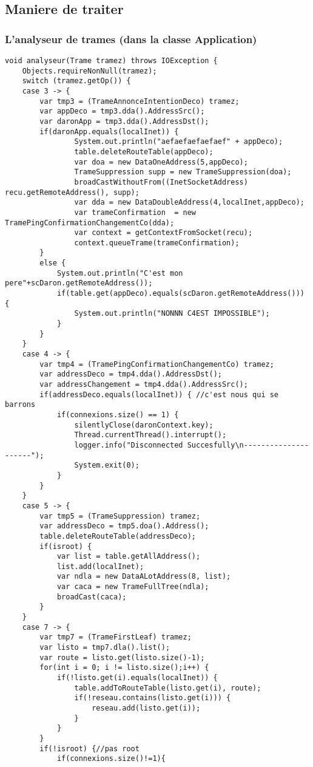\documentclass[a4paper,titlepage]{report}
\begin{document}
\subsection{Maniere de traiter}
\subsubsection{L'analyseur de trames (dans la classe Application)}
\begin{lstlisting}
void analyseur(Trame tramez) throws IOException {
	Objects.requireNonNull(tramez);
	switch (tramez.getOp()) {
	case 3 -> {
		var tmp3 = (TrameAnnonceIntentionDeco) tramez;
		var appDeco = tmp3.dda().AddressSrc();
		var daronApp = tmp3.dda().AddressDst();	
		if(daronApp.equals(localInet)) {
				System.out.println("aefaefaefaefaef" + appDeco);
				table.deleteRouteTable(appDeco);
				var doa = new DataOneAddress(5,appDeco);
				TrameSuppression supp = new TrameSuppression(doa);
				broadCastWithoutFrom((InetSocketAddress) recu.getRemoteAddress(), supp);
				var dda = new DataDoubleAddress(4,localInet,appDeco);
				var trameConfirmation  = new TramePingConfirmationChangementCo(dda);
				var context = getContextFromSocket(recu);
				context.queueTrame(trameConfirmation);
		}
		else {
			System.out.println("C'est mon pere"+scDaron.getRemoteAddress());
			if(table.get(appDeco).equals(scDaron.getRemoteAddress())) {
				System.out.println("NONNN C4EST IMPOSSIBLE");
			}
		}
	}
	case 4 -> {
		var tmp4 = (TramePingConfirmationChangementCo) tramez;
		var addressDeco = tmp4.dda().AddressDst();
		var addressChangement = tmp4.dda().AddressSrc();
		if(addressDeco.equals(localInet)) { //c'est nous qui se barrons
			if(connexions.size() == 1) {
				silentlyClose(daronContext.key);
				Thread.currentThread().interrupt();
				logger.info("Disconnected Succesfully\n---------------------");
				System.exit(0);
			}
		}
	}
	case 5 -> {
		var tmp5 = (TrameSuppression) tramez;
		var addressDeco = tmp5.doa().Address();
		table.deleteRouteTable(addressDeco);
		if(isroot) {
			var list = table.getAllAddress();
			list.add(localInet);
			var ndla = new DataALotAddress(8, list);
			var caca = new TrameFullTree(ndla);
			broadCast(caca);
		}
	}
	case 7 -> {
		var tmp7 = (TrameFirstLeaf) tramez;
		var listo = tmp7.dla().list();
		var route = listo.get(listo.size()-1);
		for(int i = 0; i != listo.size();i++) {
			if(!listo.get(i).equals(localInet)) {
				table.addToRouteTable(listo.get(i), route);
				if(!reseau.contains(listo.get(i))) {
					reseau.add(listo.get(i));
				}
			}
		}
		if(!isroot) {//pas root
			if(connexions.size()!=1){

\end{lstlisting}
\end{document}
